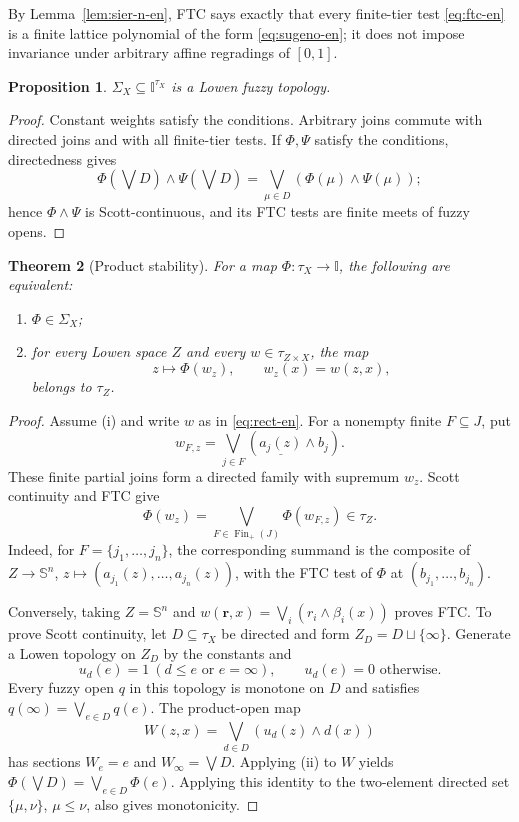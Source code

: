 \documentclass[11pt,a4paper]{article}
\numberwithin{equation}{section}
\newtheorem{theorem}{Theorem}[section]
\newtheorem{proposition}[theorem]{Proposition}
\theoremstyle{definition}
\theoremstyle{remark}
\newcommand{\I}{\mathbb I}
\newcommand{\Sier}{\mathbb S}
\newcommand{\const}[1]{\underline{#1}}
\newcommand{\Fin}{\operatorname{Fin}}
\begin{document}
By Lemma~\ref{lem:sier-n-en}, FTC says exactly that every finite-tier
test \eqref{eq:ftc-en} is a finite lattice polynomial of the form
\eqref{eq:sugeno-en}; it does not impose invariance under arbitrary
affine regradings of \([0,1]\).

\begin{proposition}\label{prop:sigma-en}
\(\Sigma_X\subseteq\I^{\tau_X}\) is a Lowen fuzzy topology.
\end{proposition}

\begin{proof}
Constant weights satisfy the conditions.  Arbitrary joins commute with
directed joins and with all finite-tier tests.  If \(\Phi,\Psi\) satisfy
the conditions, directedness gives
\[
 \Phi\left(\bigvee D\right)\wedge \Psi\left(\bigvee D\right)
 =\bigvee_{\mu\in D}(\Phi(\mu)\wedge\Psi(\mu));
\]
hence \(\Phi\wedge\Psi\) is Scott-continuous, and its FTC tests are
finite meets of fuzzy opens.
\end{proof}

\begin{theorem}[Product stability]\label{thm:prod-stable-en}
For a map \(\Phi:\tau_X\to\I\), the following are equivalent:
\begin{enumerate}[label=(\roman*)]
 \item \(\Phi\in\Sigma_X\);
 \item for every Lowen space \(Z\) and every
 \(w\in\tau_{Z\times X}\), the map
 \[
  z\longmapsto\Phi(w_z),\qquad w_z(x)=w(z,x),
 \]
 belongs to \(\tau_Z\).
\end{enumerate}
\end{theorem}

\begin{proof}
Assume (i) and write \(w\) as in \eqref{eq:rect-en}.  For a nonempty
finite \(F\subseteq J\), put
\[
 w_{F,z}=\bigvee_{j\in F}
       (\const{a_j(z)}\wedge b_j).
\]
These finite partial joins form a directed family with supremum \(w_z\).
Scott continuity and FTC give
\[
 \Phi(w_z)=\bigvee_{F\in\Fin_+(J)}\Phi(w_{F,z})\in\tau_Z.
\]
Indeed, for \(F=\{j_1,\ldots,j_n\}\), the corresponding summand is the
composite of \(Z\to\Sier^n\),
\(z\mapsto(a_{j_1}(z),\ldots,a_{j_n}(z))\), with the FTC test of
\(\Phi\) at \((b_{j_1},\ldots,b_{j_n})\).

Conversely, taking \(Z=\Sier^n\) and
\(w(\boldsymbol r,x)=\bigvee_i(r_i\wedge\beta_i(x))\) proves FTC.  To
prove Scott continuity, let \(D\subseteq\tau_X\) be directed and form
\(Z_D=D\sqcup\{\infty\}\).  Generate a Lowen topology on \(Z_D\) by
the constants and
\[
 u_d(e)=1\ (d\leq e\text{ or }e=\infty),
 \qquad u_d(e)=0\text{ otherwise}.
\]
Every fuzzy open \(q\) in this topology is monotone on \(D\) and
satisfies \(q(\infty)=\bigvee_{e\in D}q(e)\).  The product-open map
\[
 W(z,x)=\bigvee_{d\in D}(u_d(z)\wedge d(x))
\]
has sections \(W_e=e\) and \(W_\infty=\bigvee D\).  Applying (ii) to
\(W\) yields
\(\Phi(\bigvee D)=\bigvee_{e\in D}\Phi(e)\).  Applying this identity to
the two-element directed set \(\{\mu,\nu\}\), \(\mu\leq\nu\), also
gives monotonicity.
\end{proof}
\end{document}
